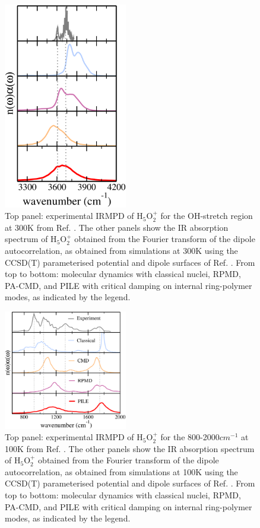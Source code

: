 \documentclass[aps,prb,superscriptaddress,amsmath,amssymb,showpacs,twocolumn]{revtex4}
\begin{document}
\begin{figure}[htbp]
\centering\includegraphics[width=0.48\textwidth]{figures/oh-stretch-300K.pdf}
\caption{Top panel: experimental IRMPD of H$_5$O$_2^+$ for the OH-stretch region at 300K from Ref. \cite{YehLee1989}.
The other panels show the IR absorption spectrum of H$_5$O$_2^+$ obtained from the Fourier transform of 
the dipole autocorrelation, as obtained from simulations at 300K using the CCSD(T) parameterised potential 
and dipole surfaces of Ref. \cite{HuangBraamsBowman2005}. From top to bottom:
 molecular dynamics with classical nuclei, RPMD, PA-CMD, and PILE with critical damping on internal ring-polymer modes,
as indicated by the legend.}
\label{fig:zundel-highf}
\end{figure}


\begin{figure}[htbp]
\centering\includegraphics[width=0.48\textwidth]{figures/zundel_lowfreq_100K.pdf}
\caption{Top panel: experimental IRMPD of H$_5$O$_2^+$ for the 800-2000$cm^{-1}$ at 100K from Ref. \cite{AsmisScience2003}.
The other panels show the IR absorption spectrum of H$_5$O$_2^+$ obtained from the Fourier transform of 
the dipole autocorrelation, as obtained from simulations at 100K using the CCSD(T) parameterised potential 
and dipole surfaces of Ref. \cite{HuangBraamsBowman2005}. From top to bottom:
 molecular dynamics with classical nuclei, RPMD, PA-CMD, and PILE with critical damping on internal ring-polymer modes,
as indicated by the legend.}
\label{fig:zundel-lowf}
\end{figure}
\end{document}
